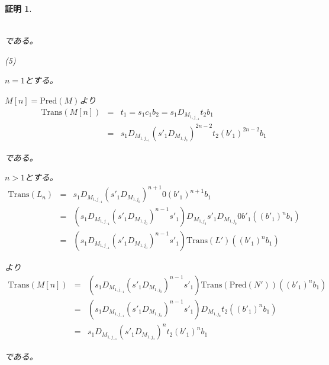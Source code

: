 \documentclass[dvipdfmx,uplatex]{jsarticle}
\theoremstyle{customnonumberbreakfortheorem}
\theoremstyle{customnonumberbreakforproof}
\newtheorem{hideableproof}{証明}
\begin{document}
\begin{hideableproof}
\begin{indented}
\begin{indented}
\begin{eqnarray*}
			\end{eqnarray*}
			\item である。
		\end{indented}
		\item
		\item (5)
		\item \(n=1\)とする。
		\begin{indented}
			\item \(M[n] = \textrm{Pred}(M)\)より
			\begin{eqnarray*}
			\textrm{Trans}(M[n]) & = & t_1 = s_1 c_1 b_2 = s_1 D_{M_{1,j_{-1}}} t_2 b_1 \\
			& = & s_1 D_{M_{1,j_{-1}}} (s'_1 D_{M_{1,j_0}})^{2n-2} t_2 (b'_1)^{2n-2} b_1
			\end{eqnarray*}
			\item である。
		\end{indented}
		\item
		\item \(n > 1\)とする。
		\begin{eqnarray*}
		\textrm{Trans}(L_n) & = & s_1 D_{M_{1,j_{-1}}} (s'_1 D_{M_{1,j_0}})^{n+1} 0 (b'_1)^{n+1} b_1 \\
		& = & (s_1 D_{M_{1,j_{-1}}} (s'_1 D_{M_{1,j_0}})^{n-1} s'_1) D_{M_{1,j_0}} s'_1 D_{M_{1,j_0}} 0 b'_1 ((b'_1)^n b_1) \\
		& = & (s_1 D_{M_{1,j_{-1}}} (s'_1 D_{M_{1,j_0}})^{n-1} s'_1) \textrm{Trans}(L') ((b'_1)^n b_1)
		\end{eqnarray*}
		\begin{indented}
			\item より
			\begin{eqnarray*}
			\textrm{Trans}(M[n]) & = & (s_1 D_{M_{1,j_{-1}}} (s'_1 D_{M_{1,j_0}})^{n-1} s'_1) \textrm{Trans}(\textrm{Pred}(N')) ((b'_1)^n b_1) \\
			& = & (s_1 D_{M_{1,j_{-1}}} (s'_1 D_{M_{1,j_0}})^{n-1} s'_1) D_{M_{1,j_0}} t_2 ((b'_1)^n b_1) \\
			& = & s_1 D_{M_{1,j_{-1}}} (s'_1 D_{M_{1,j_0}})^n t_2 (b'_1)^n b_1
			\end{eqnarray*}
			\item である。
		\end{indented}
	\end{indented}
\end{hideableproof}
\end{document}
